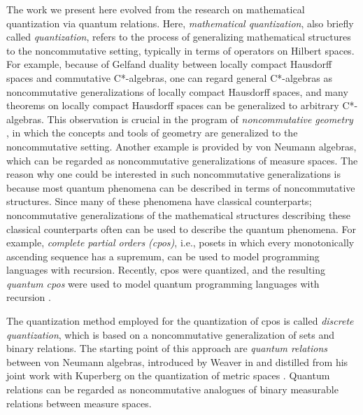\documentclass[12pt]{tac}
\theoremstyle{definition}
\theoremstyle{remark}
\newcommand{\<}{\langle}
\renewcommand{\>}{\rangle}
\renewcommand{\:}{\colon}
\begin{document}
The work we present here evolved from the research on mathematical quantization via quantum relations. Here, \emph{mathematical quantization}, also briefly called \emph{quantization}, refers to the process of generalizing mathematical structures to the noncommutative setting, typically in terms of operators on Hilbert spaces. For example, because of Gelfand duality between locally compact Hausdorff spaces and commutative C*-algebras, one can regard general C*-algebras as noncommutative generalizations of locally compact Hausdorff spaces, and many theorems on locally compact Hausdorff spaces can be generalized to arbitrary C*-algebras. This observation is crucial in the program of \emph{noncommutative geometry} \cite{connes:ncg}, in which the concepts and tools of geometry are generalized to the noncommutative setting. Another example is provided by von Neumann algebras, which can be regarded as noncommutative generalizations of measure spaces. The reason why one could be interested in such noncommutative generalizations is because most quantum phenomena can be described in terms of noncommutative structures. Since many of these phenomena have classical counterparts; noncommutative generalizations of the mathematical structures describing these classical counterparts often can be used to describe the quantum phenomena. For example, \emph{complete partial orders (cpos)}, i.e., posets in which every monotonically ascending sequence has a supremum, can be used to model programming languages with recursion. Recently, cpos were quantized, and the resulting \emph{quantum cpos} were used to model quantum programming languages with recursion \cite{klm-quantumcpos,klm-qpl}.
 
The quantization method employed for the quantization of cpos is called \emph{discrete quantization}, which is based on a noncommutative generalization of sets and binary relations. The starting point of this approach are \emph{quantum relations} between von Neumann algebras, introduced by Weaver in \cite{Weaver10} and distilled from his joint work with Kuperberg on the quantization of metric spaces \cite{kuperbergweaver:quantummetrics}. Quantum relations can be regarded as noncommutative analogues of binary measurable relations between measure spaces.
\end{document}
